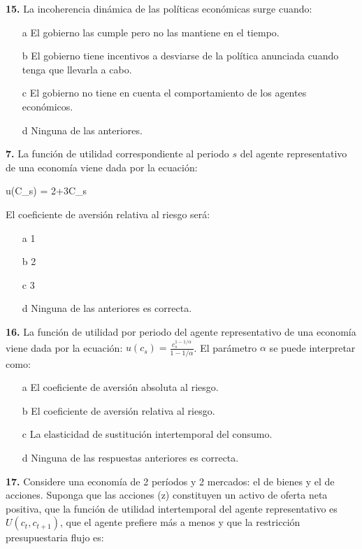\documentclass{nuevotema}
\begin{document}
\preguntas

\textbf{15.} La incoherencia dinámica de las políticas económicas surge cuando:

\begin{itemize}
	\item[a] El gobierno las cumple pero no las mantiene en el tiempo.
	\item[b] El gobierno tiene incentivos a desviarse de la política anunciada cuando tenga que llevarla a cabo.
	\item[c] El gobierno no tiene en cuenta el comportamiento de los agentes económicos.
	\item[d] Ninguna de las anteriores.
\end{itemize}

\textbf{7.} La función de utilidad correspondiente al periodo $s$ del agente representativo de una economía viene dada por la ecuación:
\begin{ecuacion}
	u(C_s) = 2+3C_s
\end{ecuacion}

El coeficiente de aversión relativa al riesgo será:

\begin{enumerate}
	\item[a] 1
	\item[b] 2
	\item[c] 3
	\item[d] Ninguna de las anteriores es correcta.
\end{enumerate}


\textbf{16.} La función de utilidad por periodo del agente representativo de una economía viene dada por la ecuación: $u(c_s) = \frac{c_s^{1-1/\alpha}}{1-1/\alpha}$. El parámetro $\alpha$ se puede interpretar como:

\begin{enumerate}
    \item[a] El coeficiente de aversión absoluta al riesgo.
    \item[b] El coeficiente de aversión relativa al riesgo.
    \item[c] La elasticidad de sustitución intertemporal del consumo.
    \item[d] Ninguna de las respuestas anteriores es correcta.
\end{enumerate}

\textbf{17.} Considere una economía de 2 períodos y 2 mercados: el de bienes y el de acciones. Suponga que las acciones (z) constituyen un activo de oferta neta positiva, que la función de utilidad intertemporal del agente representativo es $U(c_t, c_{t+1})$, que el agente prefiere más a menos y que la restricción presupuestaria flujo es:
\end{document}
